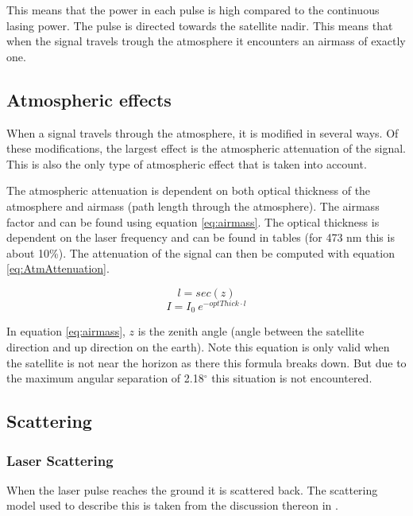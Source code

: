 This means that the power in each pulse is high compared to the continuous lasing power. The pulse is directed towards the satellite nadir. This means that when the signal travels trough the atmosphere it encounters an airmass of exactly one.

\subsection{Atmospheric effects}

When a signal travels through the atmosphere, it is modified in several ways. Of these modifications, the largest effect is the atmospheric attenuation of the signal. This is also the only type of atmospheric effect that is taken into account.

The atmospheric attenuation is dependent on both optical thickness of the atmosphere and airmass (path length through the atmosphere). The airmass factor and can be found using equation \ref{eq:airmass}. The optical thickness is dependent on the laser frequency and can be found in tables (for 473 nm this is about 10\%). The attenuation of the signal can then be computed with equation \ref{eq:AtmAttenuation}.

\begin{equation}
	l = sec (z)
	\label{eq:airmass}
\end{equation}
\begin{equation}
	I = I_0 \: e^{ -optThick \cdot l }
	\label{eq:AtmAttenuation}
\end{equation}

In equation \ref{eq:airmass}, $z$ is the zenith angle (angle between the satellite direction and up direction on the earth). Note this equation is only valid when the satellite is not near the horizon as there this formula breaks down. But due to the maximum angular separation of 2.18$^\circ$ this situation is not encountered.

\subsection{Scattering}
\subsubsection{Laser Scattering}
\label{scatter}
When the laser pulse reaches the ground it is scattered back. The scattering model used to describe this is taken from the discussion thereon in \cite{rees}. 

